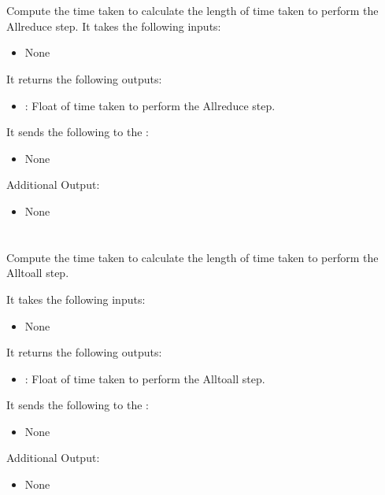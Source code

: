 \section{}
Compute the time taken to calculate the length of time taken to perform the Allreduce step.
It takes the following inputs:

\begin{itemize}
\item None
\end{itemize}

It returns the following outputs:

\begin{itemize}
\item {}: Float of time taken to perform the Allreduce step.
\end{itemize}

It sends the following to the :

\begin{itemize}
\item None
\end{itemize}

Additional Output:
\begin{itemize}
\item None
\end{itemize}


\section{}
Compute the time taken to calculate the length of time taken to perform the Alltoall step.

It takes the following inputs:

\begin{itemize}
\item None
\end{itemize}

It returns the following outputs:

\begin{itemize}
\item {}: Float of time taken to perform the Alltoall step.
\end{itemize}

It sends the following to the :

\begin{itemize}
\item None
\end{itemize}

Additional Output:
\begin{itemize}
\item None
\end{itemize}

